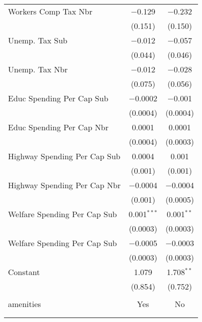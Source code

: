 \begin{table}[!htbp]
\begin{tabular}{@{\extracolsep{5pt}}lcc}
  Workers Comp Tax Nbr & $-$0.129 & $-$0.232 \\ 
  & (0.151) & (0.150) \\ 
  Unemp. Tax Sub & $-$0.012 & $-$0.057 \\ 
  & (0.044) & (0.046) \\ 
  Unemp. Tax Nbr & $-$0.012 & $-$0.028 \\ 
  & (0.075) & (0.056) \\ 
  Educ Spending Per Cap Sub & $-$0.0002 & $-$0.001 \\ 
  & (0.0004) & (0.0004) \\ 
  Educ Spending Per Cap Nbr & 0.0001 & 0.0001 \\ 
  & (0.0004) & (0.0003) \\ 
  Highway Spending Per Cap Sub & 0.0004 & 0.001 \\ 
  & (0.001) & (0.001) \\ 
  Highway Spending Per Cap Nbr & $-$0.0004 & $-$0.0004 \\ 
  & (0.001) & (0.0005) \\ 
  Welfare Spending Per Cap Sub & 0.001$^{***}$ & 0.001$^{**}$ \\ 
  & (0.0003) & (0.0003) \\ 
  Welfare Spending Per Cap Sub & $-$0.0005 & $-$0.0003 \\ 
  & (0.0003) & (0.0003) \\ 
  Constant & 1.079 & 1.708$^{**}$ \\ 
  & (0.854) & (0.752) \\ 
 \hline \\[-1.8ex] 
amenities & Yes & No \\ 
\hline \\[-1.8ex] 
\hline 
\hline \\[-1.8ex] 
\end{tabular} 
\end{table} 
